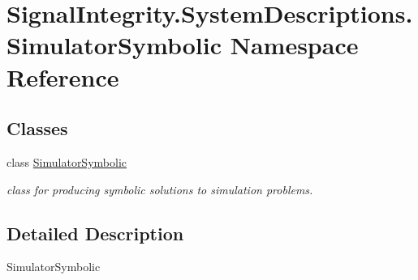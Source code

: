 \hypertarget{namespaceSignalIntegrity_1_1SystemDescriptions_1_1SimulatorSymbolic}{}\section{Signal\+Integrity.\+System\+Descriptions.\+Simulator\+Symbolic Namespace Reference}
\label{namespaceSignalIntegrity_1_1SystemDescriptions_1_1SimulatorSymbolic}
\subsection*{Classes}
\begin{DoxyCompactItemize}
\item 
class \hyperlink{classSignalIntegrity_1_1SystemDescriptions_1_1SimulatorSymbolic_1_1SimulatorSymbolic}{Simulator\+Symbolic}
\begin{DoxyCompactList}\small\item\em class for producing symbolic solutions to simulation problems. \end{DoxyCompactList}\end{DoxyCompactItemize}


\subsection{Detailed Description}
\begin{DoxyVerb}SimulatorSymbolic\end{DoxyVerb}
 